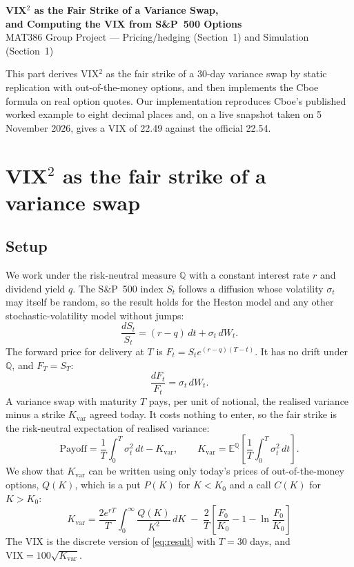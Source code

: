 \documentclass[12pt]{article}
\newcommand{\E}{\mathbb{E}^{\mathbb{Q}}}
\newcommand{\Kvar}{K_{\mathrm{var}}}
\newcommand{\VIX}{\mathrm{VIX}}
\begin{document}
\begin{center}
  {\Large\bfseries VIX$^2$ as the Fair Strike of a Variance Swap,\\[2pt] and Computing the VIX from S\&P~500 Options}\\[6pt]
  MAT386 Group Project --- Pricing/hedging (Section~1) and Simulation (Section~1)
\end{center}

\noindent This part derives VIX$^2$ as the fair strike of a 30-day variance swap by static replication with out-of-the-money options, and then implements the Cboe formula on real option quotes. Our implementation reproduces Cboe's published worked example to eight decimal places and, on a live snapshot taken on 5 November 2026, gives a VIX of 22.49 against the official 22.54.

\section{VIX$^2$ as the fair strike of a variance swap}

\subsection{Setup}

We work under the risk-neutral measure $\mathbb{Q}$ with a constant interest rate $r$ and dividend yield $q$. The S\&P~500 index $S_t$ follows a diffusion whose volatility $\sigma_t$ may itself be random, so the result holds for the Heston model and any other stochastic-volatility model without jumps:
\begin{equation}
  \frac{dS_t}{S_t} = (r-q)\,dt + \sigma_t\,dW_t .
\end{equation}
The forward price for delivery at $T$ is $F_t = S_t e^{(r-q)(T-t)}$. It has no drift under $\mathbb{Q}$, and $F_T = S_T$:
\begin{equation}
  \frac{dF_t}{F_t} = \sigma_t\,dW_t .
  \label{eq:fwd}
\end{equation}
A variance swap with maturity $T$ pays, per unit of notional, the realised variance minus a strike $\Kvar$ agreed today. It costs nothing to enter, so the fair strike is the risk-neutral expectation of realised variance:
\begin{equation}
  \text{Payoff} = \frac{1}{T}\int_0^T \sigma_t^2\,dt - \Kvar,
  \qquad
  \Kvar = \E\!\left[\frac{1}{T}\int_0^T \sigma_t^2\,dt\right].
\end{equation}
We show that $\Kvar$ can be written using only today's prices of out-of-the-money options, $Q(K)$, which is a put $P(K)$ for $K<K_0$ and a call $C(K)$ for $K>K_0$:
\begin{equation}
  \Kvar = \frac{2e^{rT}}{T}\int_0^{\infty}\frac{Q(K)}{K^2}\,dK
  \;-\; \frac{2}{T}\left[\frac{F_0}{K_0}-1-\ln\frac{F_0}{K_0}\right]
  \label{eq:result}
\end{equation}
The VIX is the discrete version of \eqref{eq:result} with $T=30$ days, and $\VIX = 100\sqrt{\Kvar}$.
\end{document}
